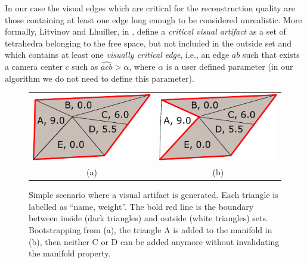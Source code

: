 In our case the visual edges which are critical for the reconstruction quality are those containing at least one edge long enough to be considered unrealistic. 
More formally, Litvinov and Lhuiller, in \cite{litvinov_Lhiuller14}, define a \emph{critical visual artifact} as a set of tetrahedra belonging to the free space, but not included in the outside set and which contains at least one \emph{visually critical edge}, i.e., an edge $ab$ such that exists a camera center $c$ such as $\widehat{acb}>\alpha$, where $\alpha$ is a user defined parameter (in our algorithm we do not need to define this parameter).
\begin{figure}
\centering
\begin{tabular}{cc}
\includegraphics[width=0.35\columnwidth]{./img//artifacts01}&
\includegraphics[width=0.35\columnwidth]{./img//artifacts02}\\
(a) & (b)
\end{tabular}
\caption{Simple scenario where a visual artifact is generated. Each triangle is labelled as ``name, weight''. The bold red line is the boundary between inside (dark triangles) and outside (white triangles) sets. Bootstrapping from (a), the triangle A is added to the manifold in (b), then neither C or D can be added anymore without invalidating the manifold property.}
\label{fig:artifact}
\end{figure}


